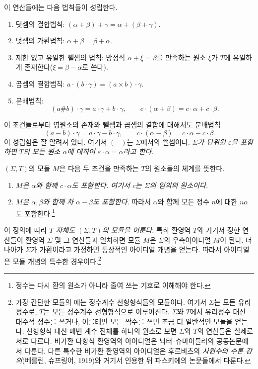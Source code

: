 이 연산들에는 다음 법칙들이 성립한다.
\begin{enumerate}
\item 덧셈의 결합법칙: $(\alpha+\beta)+\gamma=\alpha+(\beta+\gamma)$.
\item 덧셈의 가환법칙: $\alpha+\beta=\beta+\alpha$.
\item 제한 없고 유일한 뺄셈의 법칙: 방정식 $\alpha+\xi=\beta$를 만족하는 원소 $\xi$가 $T$에 유일하게 존재한다($\xi=\beta-\alpha$로 쓴다).
\item 곱셈의 결합법칙: $a\cdot(b\cdot\gamma)=(a\times b)\cdot\gamma$.
\item 분배법칙:
\[
 (a\# b)\cdot\gamma=a\cdot\gamma+b\cdot\gamma,
 \qquad c\cdot(\alpha+\beta)=c\cdot\alpha+c\cdot\beta.
\]
\end{enumerate}
이 조건들로부터 영원소의 존재와 뺄셈과 곱셈의 결합에 대해서도 분배법칙
\[
 (a-b)\cdot\gamma=a\cdot\gamma-b\cdot\gamma,
 \qquad c\cdot(\alpha-\beta)=c\cdot\alpha-c\cdot\beta
\]
이 성립함은 잘 알려져 있다. 여기서 $(-)$는 $\Sigma$에서의 뺄셈이다. \emph{$\Sigma$가 단위원 $\varepsilon$을 포함하면 $T$의 모든 원소 $\alpha$에 대하여 $\varepsilon\cdot\alpha=\alpha$라고 한다.}

$(\Sigma,T)$의 모듈 $M$은 다음 두 조건을 만족하는 $T$의 원소들의 체계를 뜻한다.
\begin{enumerate}
\item \emph{$M$은 $\alpha$와 함께 $c\cdot\alpha$도 포함한다. 여기서 $c$는 $\Sigma$의 임의의 원소이다.}
\item \emph{$M$은 $\alpha,\beta$와 함께 차 $\alpha-\beta$도 포함한다.} 따라서 $\alpha$와 함께 모든 정수 $n$에 대한 $n\alpha$도 포함한다.\footnote{정수는 다시 환의 원소가 아니라 줄여 쓰는 기호로 이해해야 한다.}
\end{enumerate}
이 정의에 따라 \emph{$T$ 자체도 $(\Sigma,T)$의 모듈을 이룬다.} 특히 환영역 $T$와 거기서 정한 연산들이 환영역 $\Sigma$ 및 그 연산들과 일치하면 모듈 $M$은 $\Sigma$의 우측아이디얼 $M$이 된다. 더 나아가 $\Sigma$가 가환이라고 가정하면 통상적인 아이디얼 개념을 얻는다. 따라서 아이디얼은 모듈 개념의 특수한 경우이다.\footnote{가장 간단한 모듈의 예는 정수계수 선형형식들의 모듈이다. 여기서 $\Sigma$는 모든 유리정수로, $T$는 모든 정수계수 선형형식으로 이루어진다. $\Sigma$와 $T$에서 유리정수 대신 대수적 정수를 쓰거나, 이를테면 모든 짝수를 쓰면 조금 더 일반적인 모듈을 얻는다. 선형형식 대신 매번 계수 전체를 하나의 원소로 보면 $\Sigma$와 $T$의 연산들은 실제로 서로 다르다. 비가환 다항식 환영역의 아이디얼은 뇌터--슈마이들러의 공동논문에서 다룬다. 다른 특수한 비가환 환영역의 아이디얼은 후르비츠의 \emph{사원수의 수론 강의}(베를린, 슈프링어, 1919)와 거기서 인용한 뒤 파스키에의 논문들에서 다룬다.}

